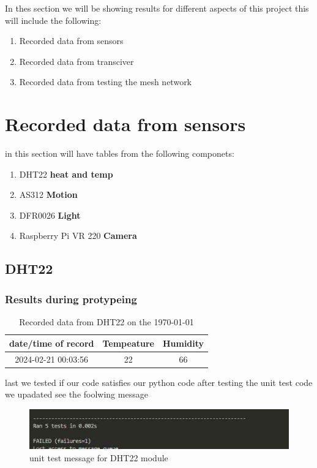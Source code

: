 In thes section we will  be showing results for  different aspects of this project this  will  include the following:
\begin{enumerate}
    \item Recorded data from sensors
    \item Recorded data from transciver
    \item Recorded data from  testing the mesh network
\end{enumerate}
\section{Recorded data from sensors}
in this section  will have  tables from the following componets:
\begin{enumerate}
    \item DHT22 \textbf{heat and temp}
    \item AS312 \textbf{Motion }
    \item DFR0026 \textbf{Light}
    \item Raspberry Pi VR 220 \textbf{Camera}
\end{enumerate}
\subsection{DHT22}
\subsubsection{Results during protypeing}
\begin{table}[h!]
    \begin{tabular}{|c|c|c|}
        \hline
        date/time of record & Tempeature &Humidity \\
        \hline\hline
        2024-02-21 00:03:56&22& 66 \\
    \end{tabular}
    \caption{Recorded data from  DHT22 on the \today}
    \label{Recorded data from  DHT22 on the \today}
\end{table}

last we tested if our code  satisfies our  python code after testing the unit test code we upadated see the foolwing message
\begin{figure}[h!]
    \centering
    \includegraphics[width=0.5\linewidth]{Images/unit_testoutput.jpg}
    \caption{unit test message for DHT22 module}
    \label{unit test message for DHT22 module}
\end{figure}
\newpage

